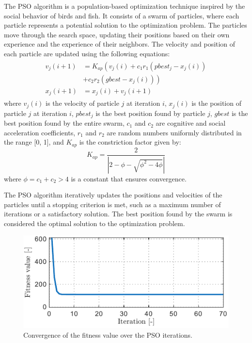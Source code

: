 The PSO algorithm is a population-based optimization technique inspired by the social behavior of birds and fish. It consists of a swarm of particles, where each particle represents a potential solution to the optimization problem. The particles move through the search space, updating their positions based on their own experience and the experience of their neighbors. The velocity and position of each particle are updated using the following equations:
\begin{align}
    \begin{aligned}
        v_j(i + 1) &= K_{ap}\left(v_j(i) + c_1 r_1 (pbest_j - x_j(i)) \right.\\
        & \left. + c_2 r_2 (gbest - x_j(i))\right)\\
        x_j(i + 1) &= x_j(i) + v_j(i + 1)
    \end{aligned}
\end{align}
where $v_j(i)$ is the velocity of particle $j$ at iteration $i$, $x_j(i)$ is the position of particle $j$ at iteration $i$, $pbest_j$ is the best position found by particle $j$, $gbest$ is the best position found by the entire swarm, $c_1$ and $c_2$ are cognitive and social acceleration coefficients, $r_1$ and $r_2$ are random numbers uniformly distributed in the range [0, 1], and $K_{ap}$ is the constriction factor given by:
\begin{equation}
    K_{ap} = \dfrac{2}{\left|2 - \phi - \sqrt{\phi^2 - 4\phi}\right|}
\end{equation}
where $\phi = c_1 + c_2 > 4$ is a constant that ensures convergence.

The PSO algorithm iteratively updates the positions and velocities of the particles until a stopping criterion is met, such as a maximum number of iterations or a satisfactory solution. The best position found by the swarm is considered the optimal solution to the optimization problem.

\begin{figure}[t!]
    \centering
    \includegraphics[width = \columnwidth]{Images/Fitness_iterations.pdf}
    \caption{Convergence of the fitness value over the PSO iterations.}
    \label{fig:PSO_Fitness}
\end{figure}

